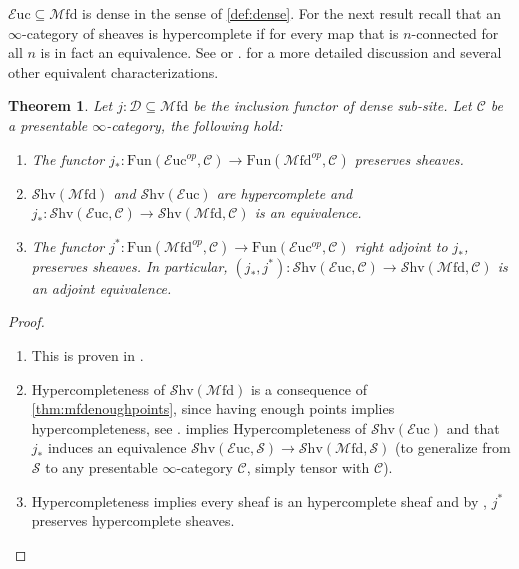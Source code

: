 \documentclass[10pt]{amsart}
\newcommand{\C}{\mathscr{C}}
\newcommand{\D}{\mathscr{D}}
\newcommand{\s}{\mathscr{S}}
\newcommand{\Fun}{\mathrm{Fun}}
\newcommand{\Euc}{\mathscr{E}\mathrm{uc}}
\newcommand{\Mfd}{\mathscr{M}\mathrm{fd}}
\newcommand{\Shv}{\mathscr{S}\mathrm{hv}}
\newtheorem{theorem}[equation]{Theorem}
\theoremstyle{definition}
\theoremstyle{remark}
\newtheorem{remark}[equation]{Remark}
\numberwithin{equation}{section}
\begin{document}
$\Euc\subseteq\Mfd$ is dense in the sense of \cref{def:dense}. For the next result recall that an $\infty$-category of sheaves is hypercomplete if for every map that is $n$-connected for all $n$ is in fact an equivalence. See \cite[\S\S 6.5.2]{lurie2009htt} or \cite{dugger2003hypercoverssimplicialpresheaves}. for a more detailed discussion and several other equivalent characterizations. 

\begin{theorem}
Let $j:\D\subseteq\Mfd$ be the inclusion functor of dense sub-site. Let $\C$ be a presentable $\infty$-category, the following hold:
\begin{enumerate}
	\item The functor $j_*:\Fun(\Euc^{op},\C)\to\Fun(\Mfd^{op},\C)$ preserves sheaves. 
	\item $\Shv(\Mfd)$ and $\Shv(\Euc)$ are hypercomplete and $j_*:\Shv(\Euc,\C)\to\Shv(\Mfd,\C)$ is an equivalence. 
	\item The functor $j^*:\Fun(\Mfd^{op},\C)\to\Fun(\Euc^{op},\C)$ right adjoint to $j_*$, preserves sheaves. In particular, $(j_*,j^*):\Shv(\Euc,\C)\to\Shv(\Mfd,\C)$ is an adjoint equivalence.
\end{enumerate}
\end{theorem}
\begin{proof}
	\begin{enumerate}
		\item This is proven in \cite[Lemma 3.12.7]{barwick2020exodromy}.
		\item Hypercompleteness of $\Shv(\Mfd)$ is a consequence of \cref{thm:mfdenoughpoints}, since having enough points implies hypercompleteness, see \cite[Example 3.11.10]{barwick2020exodromy}. \cite[Corollary 3.12.13]{barwick2020exodromy} implies Hypercompleteness of $\Shv(\Euc)$ and that $j_*$ induces an equivalence $\Shv(\Euc,\s)\to\Shv(\Mfd,\s)$ (to generalize from $\s$ to any presentable $\infty$-category $\C$, simply tensor with $\C$).
		\item Hypercompleteness implies every sheaf is an hypercomplete sheaf and by \cite[Proposition 3.12.11]{barwick2020exodromy}, $j^*$ preserves hypercomplete sheaves. 
	\end{enumerate}
\end{proof}


{\footnotesize


}
\end{document}
